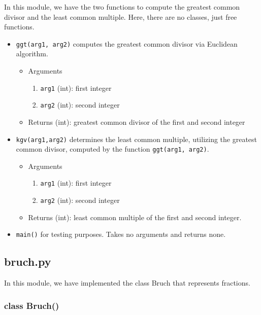 \documentclass[refman]{scrartcl}
\begin{document}
In this module, we have the two functions to compute the greatest common divisor and the least common multiple. Here, there are no classes, just free functions.

\begin{itemize}
    \item \texttt{ggt(arg1, arg2)}
    computes the greatest common divisor via Euclidean algorithm.
    \begin{itemize}
        \item Arguments
        \begin{enumerate}
            \item \texttt{arg1} (int): first integer
            \item \texttt{arg2} (int): second integer
        \end{enumerate}
        \item Returns (int): greatest common divisor of the first and second integer
    \end{itemize}
    \item \texttt{kgv(arg1,arg2)}
    determines the least common multiple, utilizing the greatest common divisor, computed by the function \texttt{ggt(arg1, arg2)}.
    \begin{itemize}
        \item Arguments
        \begin{enumerate}
            \item \texttt{arg1} (int): first integer
            \item \texttt{arg2} (int): second integer
        \end{enumerate}
        \item Returns (int): least common multiple of the first and second integer.
    \end{itemize}
    \item \texttt{main()} for testing purposes. Takes no arguments and returns none.
\end{itemize}

\subsection{bruch.py}

In this module, we have implemented the class Bruch that represents fractions.

\subsubsection{class Bruch()}
\end{document}
